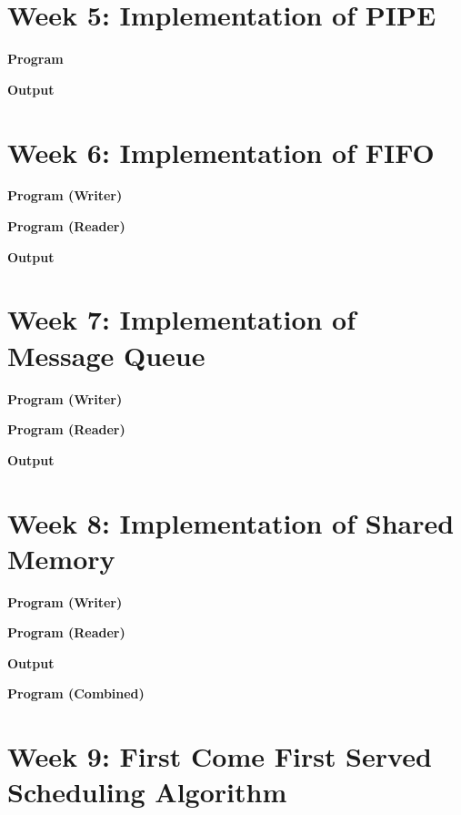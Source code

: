 \documentclass{article}
\begin{document}
\newpage
\section{Week 5: Implementation of PIPE}

\noindent \textbf{\large{Program}}


\noindent \textbf{\large{Output}}


\newpage
\section{Week 6: Implementation of FIFO}

\noindent \textbf{\large{Program (Writer)}}


\noindent \textbf{\large{Program (Reader)}}


\noindent \textbf{\large{Output}}


\newpage
\section{Week 7: Implementation of Message Queue}

\noindent \textbf{\large{Program (Writer)}}


\noindent \textbf{\large{Program (Reader)}}


\noindent \textbf{\large{Output}}


\newpage
\section{Week 8: Implementation of Shared Memory}

\noindent \textbf{\large{Program (Writer)}}


\noindent \textbf{\large{Program (Reader)}}


\noindent \textbf{\large{Output}}


\noindent \textbf{\large{Program (Combined)}}


\newpage
\section{Week 9: First Come First Served Scheduling Algorithm}
\end{document}

